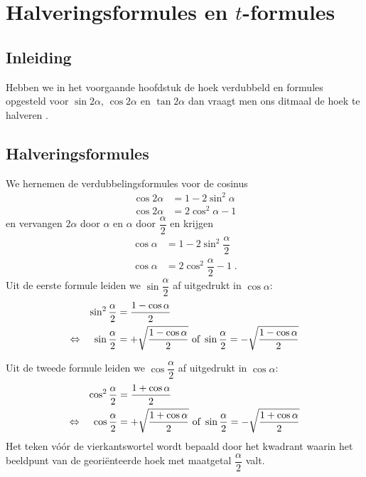 \documentclass[a4paper,12pt]{article}
\begin{document}
\pagebreak
\section{Halveringsformules en $t$-formules}

\begin{theorie}

\vspace*{-0.5cm}
\subsection{Inleiding}
Hebben we in het voorgaande hoofdstuk de hoek verdubbeld en formules opgesteld
voor $\sin 2\alpha$, $\cos 2\alpha$ en $\tan 2\alpha$ dan vraagt men ons ditmaal de hoek te halveren .

\vspace*{-0.5cm}
\subsection{Halveringsformules}

We hernemen de verdubbelingsformules voor de cosinus
\begin{align*}
  \cos 2\alpha &= 1 - 2\sin^2\alpha\\
  \cos 2\alpha &= 2\cos^2\alpha - 1
\end{align*}
en vervangen $2\alpha$ door $\alpha$ en $\alpha$ door $\dfrac{\alpha}{2}$ en krijgen
\begin{align*}
  \cos \alpha &= 1 - 2\sin^2\dfrac{\alpha}{2}\\
  \cos \alpha &= 2\cos^2\dfrac{\alpha}{2} - 1\;.
\end{align*}
Uit de eerste formule leiden we $\sin\dfrac{\alpha}{2}$ af uitgedrukt in $\cos\alpha$:
\begin{align*}
          && \sin^2\dfrac{\alpha}{2} &= \dfrac{1-\cos\alpha}{2}\\
     \Leftrightarrow &&   \sin\dfrac{\alpha}{2} &= +\sqrt{\dfrac{1-\cos\alpha}{2}} \mbox{ of } \sin\dfrac{\alpha}{2}= -\sqrt{\dfrac{1-\cos\alpha}{2}}
\end{align*}

Uit de tweede formule leiden we $\cos\dfrac{\alpha}{2}$ af uitgedrukt in $\cos\alpha$:
\begin{align*}
          && \cos^2\dfrac{\alpha}{2} &= \dfrac{1+\cos\alpha}{2}\\
     \Leftrightarrow &&   \cos\dfrac{\alpha}{2} &= +\sqrt{\dfrac{1+\cos\alpha}{2}} \mbox{ of } \sin\dfrac{\alpha}{2}= -\sqrt{\dfrac{1+\cos\alpha}{2}}
\end{align*}
Het teken vóór de vierkantswortel wordt bepaald door het kwadrant waarin het
beeldpunt van de georiënteerde hoek met maatgetal $\dfrac{\alpha}{2}$ valt.


\end{theorie}
\end{document}
